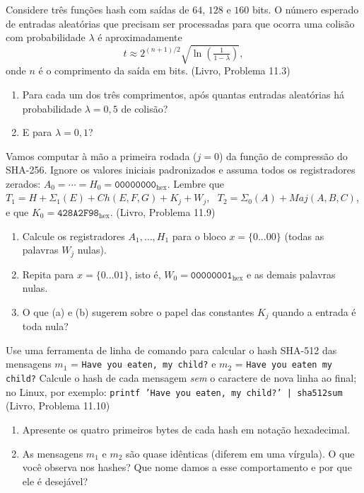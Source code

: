 \documentclass[11pt,a4paper]{article}
\newcommand{\livro}[1]{{\footnotesize\color{black!50}(Livro, Problema #1)}}
\begin{document}
\begin{exercicio}
Considere tr\^{e}s fun\c{c}\~{o}es hash com sa\'{i}das de $64$, $128$ e $160$ bits. O n\'{u}mero esperado de entradas aleat\'{o}rias que precisam ser processadas para que ocorra uma colis\~{a}o com probabilidade $\lambda$ \'{e} aproximadamente
\[
    t \approx 2^{(n+1)/2}\sqrt{\ln\!\left(\tfrac{1}{1-\lambda}\right)},
\]
onde $n$ \'{e} o comprimento da sa\'{i}da em bits. \livro{11.3}
\begin{enumerate}[label=(\alph*)]
    \item Para cada um dos tr\^{e}s comprimentos, ap\'{o}s quantas entradas aleat\'{o}rias h\'{a} probabilidade $\lambda = 0{,}5$ de colis\~{a}o?
    \item E para $\lambda = 0{,}1$?
\end{enumerate}
\end{exercicio}

\begin{exercicio}
Vamos computar \`{a} m\~{a}o a primeira rodada ($j = 0$) da fun\c{c}\~{a}o de compress\~{a}o do SHA-256. Ignore os valores iniciais padronizados e assuma todos os registradores zerados: $A_0 = \cdots = H_0 = \texttt{00000000}_{\text{hex}}$. Lembre que $T_1 = H + \Sigma_1(E) + Ch(E,F,G) + K_j + W_j$, \ $T_2 = \Sigma_0(A) + Maj(A,B,C)$, e que $K_0 = \texttt{428A2F98}_{\text{hex}}$. \livro{11.9}
\begin{enumerate}[label=(\alph*)]
    \item Calcule os registradores $A_1, \dots, H_1$ para o bloco $x = \{0\dots00\}$ (todas as palavras $W_j$ nulas).
    \item Repita para $x = \{0\dots01\}$, isto \'{e}, $W_0 = \texttt{00000001}_{\text{hex}}$ e as demais palavras nulas.
    \item O que (a) e (b) sugerem sobre o papel das constantes $K_j$ quando a entrada \'{e} toda nula?
\end{enumerate}
\end{exercicio}

\begin{exercicio}
Use uma ferramenta de linha de comando para calcular o hash SHA-512 das mensagens $m_1$ = \texttt{Have you eaten, my child?} e $m_2$ = \texttt{Have you eaten my child?} Calcule o hash de cada mensagem \emph{sem} o caractere de nova linha ao final; no Linux, por exemplo: \texttt{printf 'Have you eaten, my child?' | sha512sum} \livro{11.10}
\begin{enumerate}[label=(\alph*)]
    \item Apresente os quatro primeiros bytes de cada hash em nota\c{c}\~{a}o hexadecimal.
    \item As mensagens $m_1$ e $m_2$ s\~{a}o quase id\^{e}nticas (diferem em uma v\'{i}rgula). O que voc\^{e} observa nos hashes? Que nome damos a esse comportamento e por que ele \'{e} desej\'{a}vel?
\end{enumerate}
\end{exercicio}
\end{document}
